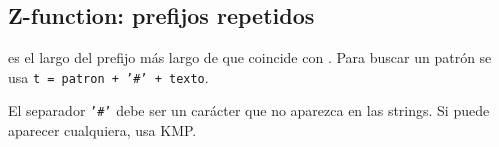 \subsection{Z-function: prefijos repetidos}\label{rec:z}

 es el largo del prefijo más largo de  que coincide
con . Para buscar un patrón se usa
\texttt{t = patron + '\#' + texto}.




El separador \texttt{'\#'} debe ser un carácter que no aparezca en las
strings. Si puede aparecer cualquiera, usa KMP.